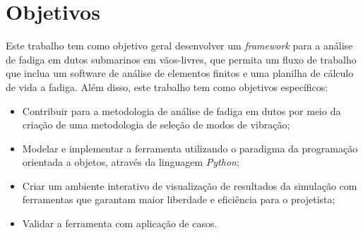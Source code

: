 % 


\section{Objetivos}

Este trabalho tem como objetivo geral desenvolver um \textit{framework} para a análise de fadiga em dutos submarinos em vãos-livres, que permita um fluxo de trabalho que inclua um software de análise de elementos finitos e uma planilha de cálculo de vida a fadiga.
Além disso, este trabalho tem como objetivos específicos:

\begin{itemize}
    \item Contribuir para a metodologia de análise de fadiga em dutos por meio da criação de uma metodologia de seleção de modos de vibração;
    \item Modelar e implementar a ferramenta utilizando o paradigma da programação orientada a objetos, através da linguagem \textit{Python};
    \item Criar um ambiente interativo de visualização de resultados da simulação com ferramentas que garantam maior liberdade e eficiência para o projetista;
    \item Validar a ferramenta com aplicação de casos.
\end{itemize}

% 